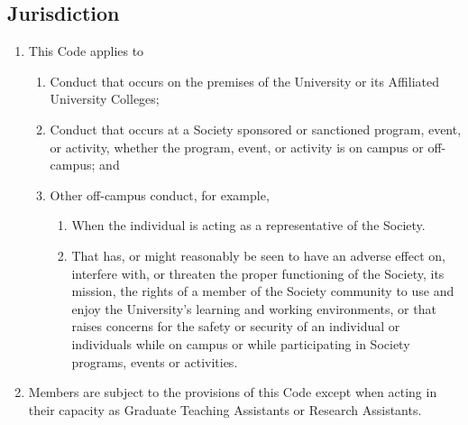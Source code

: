 \subsection{Jurisdiction}
\begin{enumerate} [align=left]
\item This Code applies to
\begin{enumerate} [label*=\arabic*., align=left]
\item Conduct that occurs on the premises of the University or its Affiliated University Colleges;
\item Conduct that occurs at a Society sponsored or sanctioned program, event, or activity, whether the program, event, or activity is on campus or off-campus; and
\item Other off-campus conduct, for example,
\begin{enumerate} [label*=\arabic*., align=left]
\item When the individual is acting as a representative of the Society. \item That has, or might reasonably be seen to have an adverse effect on, interfere with, or threaten the proper functioning of the Society, its mission, the rights of a member of the Society community to use and enjoy the University's learning and working environments, or that raises concerns for the safety or security of an individual or individuals while on campus or while participating in Society programs, events or activities.
\end{enumerate}
\end{enumerate}
\item Members are subject to the provisions of this Code except when acting in their capacity as Graduate Teaching Assistants or Research Assistants.
\end{enumerate}

